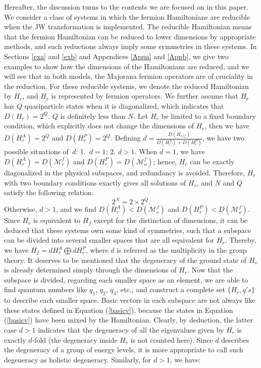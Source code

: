 \documentclass[twocolumn,floats,superscriptaddress]{revtex4}
\begin{document}
 {Hereafter, the discussion turns to the contents we are focused on} in this paper. We consider a {class} of systems in which the fermion Hamiltonians are reducible when the JW transformation is implemented. The reducible Hamiltonian means that the fermion Hamiltonian can be reduced to lower dimensions by appropriate methods, and such reductions always imply some symmetries in these systems. {In Sections \ref{exa} and \ref{exb} and Appendices \ref{Appa} and \ref{Appb}, we give two examples to show how the dimensions of the Hamiltonians are reduced, and we will see that in both models, the Majorana fermion operators are of cruciality in the reduction.}
For these reducible systems, we denote the reduced Hamiltonian by $H_r$, and $H_r$ is represented by fermion operators. We further assume that $H_r$ has $Q$ quasiparticle states when it is diagonalized, which indicates that $D(H_r)=2^Q$. $Q$ is definitely less than $N$. Let $H_r$ be limited to a fixed boundary condition, which explicitly does not change the dimensions of $H_r$, then we have $D(H_r^A)=2^Q$ and $D(H_r^P)=2^Q$. Defining $d=\frac{D(H_{s/f})}{D(H_r^A)+D(H_r^P)}$, we have two possible situations {of}~$d$: 1.~$d=1$; 2. $d>1$. When $d=1$, we have $D(H_r^A)=D(\mathcal{M}_{e}^f)$ and $D(H_r^P)=D(\mathcal{M}_{o}^f)$; hence, $H_r$ can be exactly diagonalized in the physical subspaces, and redundancy is {avoided}.
Therefore, $H_r$ with two boundary conditions exactly gives all solutions of $H_s$, and $N$ and $Q$ satisfy the following relation:
\begin{equation}\label{d1}
 2^N=2\times2^Q.
\end{equation}
Otherwise, $d>1$, and we find $D(H_r^A)<D(\mathcal{M}_{e}^f)$ and $D(H_r^P)<D(\mathcal{M}_{o}^f)$. Since $H_r$ is {equivalent} to $H_f$ except for the distinction of dimensions, it can be deduced that these systems own some kind of symmetries, such that a subspace can be divided into several smaller spaces that are all {equivalent} for $H_r$. Thereby, we have $H_f=dH_r^A\bigoplus dH_r^P$, where $d$ is referred as the multiplicity in the group theory. It deserves to be mentioned that the degeneracy of the ground state of $H_s$ is already determined simply through the {dimensions} of $H_r$. Now that the subspace is divided, regarding each smaller space as an element, we are able to find quantum numbers like $q_1$, $q_2$, $q_3$, etc., and construct a complete set $\{H_r, q's\}$ to describe each smaller space. {Basic vectors in each subspace are not always like these states defined in Equation (\ref{basicv}), because the states in Equation (\ref{basicv}) have been mixed by the Hamiltonian.} Clearly, by deduction, the latter case $d>1$ indicates that the degeneracy of all the eigenvalues given by $H_r$ is exactly $d$-fold (the degeneracy {inside} $H_r$ is not {counted} here). Since $d$ describes the degeneracy of a group of energy levels, it {is} more appropriate to call such degeneracy as {holistic degeneracy}. Similarly, {for $d>1$}, we have:
\end{document}
